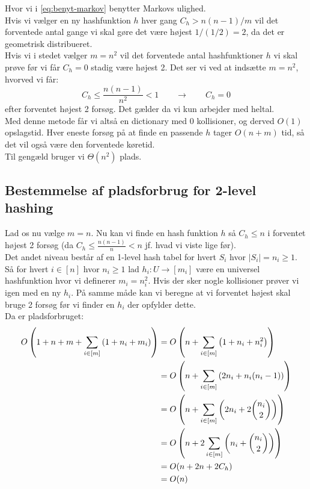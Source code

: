 Hvor vi i \cref{eq:benyt-markov} benytter Markovs ulighed.\\

Hvis vi vælger en ny hashfunktion $h$ hver gang $C_h > n(n-1)/m$ vil det forventede antal gange vi skal gøre det være højest $1/(1/2) = 2$, da det er geometrisk distribueret.\\


Hvis vi i stedet vælger $m = n^2$ vil det forventede antal hashfunktioner $h$ vi skal prøve før vi får $C_h = 0$ stadig være højest 2. Det ser vi ved at indsætte $m = n^2$, hvorved vi får:
$$
C_h \leq \frac{n(n-1)}{n^2} < 1
\quad\quad \rightarrow \quad\quad
C_h = 0
$$
efter forventet højest 2 forsøg. Det gælder da vi kun arbejder med heltal.\\

Med denne metode får vi altså en dictionary med 0 kollisioner, og derved $O(1)$ opslagstid. Hver eneste forsøg på at finde en passende $h$ tager $O(n+m)$ tid, så det vil også være den forventede køretid.\\

Til gengæld bruger vi $\Theta(n^2)$ plads.






\subsection{Bestemmelse af pladsforbrug for 2-level hashing}
Lad os nu vælge $m = n$. Nu kan vi finde en hash funktion $h$ så $C_h \leq n$ i forventet højest 2 forsøg (da $C_h \leq \frac{n(n-1)}{n} < n$ jf. hvad vi viste lige før).\\

Det andet niveau består af en 1-level hash tabel for hvert $S_i$ hvor $|S_i| = n_i \geq 1$. Så for hvert $i \in [n]$ hvor $n_i \geq 1$ lad $h_i : U \rightarrow [m_i]$ være en universel hashfunktion hvor vi definerer $m_i = n_i^2$. Hvis der sker nogle kollisioner prøver vi igen med en ny $h_i$. På samme måde kan vi beregne at vi forventet højest skal bruge 2 forsøg før vi finder en $h_i$ der opfylder dette.\\


Da er pladsforbruget:
\begin{align}
  O \left(  1 + n +m + \sum_{i \in [m]} \left(  1 + n_i + m_i  \right)    \right)
  &= O \left(  n + \sum_{i \in [m]} \left(  1 + n_i + n_i^2  \right)   \right) \label{eq:smid-ligegyldige-ting-vaak} \\
  &= O \left(  n + \sum_{i \in [m]} \left(  2 n_i + n_i ( n_i - 1)  \right)  \right) \nonumber \\
  &= O \left(  n + \sum_{i \in [m]} \left(  2 n_i + 2 \binom{n_i}{2} \right)   \right) \label{eq:benyt-binom-def} \\
  &= O \left(  n + 2 \sum_{i \in [m]} \left(  n_i + \binom{n_i}{2}  \right) \right) \nonumber \\
  &= O(n + 2n + 2C_h) \nonumber \\
  &= O(n) \nonumber
\end{align}

